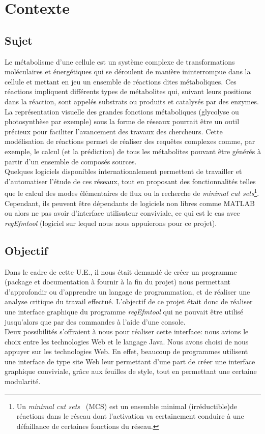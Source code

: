 \section{Contexte}

\subsection{Sujet}
Le métabolisme d'une cellule est un système complexe de transformations moléculaires et énergétiques qui se déroulent de manière ininterrompue dans la cellule et mettant en jeu un ensemble de réactions dites métaboliques. 
Ces réactions impliquent différents types de métabolites qui, suivant leurs positions dans la réaction, sont appelés substrats ou produits et catalysés par des enzymes.\\
La représentation visuelle des grandes fonctions métaboliques (glycolyse ou photosynthèse par exemple) sous la forme de réseaux pourrait être un outil précieux pour faciliter l'avancement des travaux des chercheurs. Cette modélisation de réactions permet de réaliser des requêtes complexes comme, par exemple, le calcul (et la prédiction) de tous les métabolites pouvant être générés à partir d'un ensemble de composés sources.\\
Quelques logiciels disponibles internationalement permettent de travailler et d'automatiser l'étude de ces réseaux, tout en proposant des fonctionnalités telles que le calcul des modes élémentaires de flux ou la recherche de \textit{minimal cut sets}\footnote{Un \textit{minimal cut sets}~\cite{mcs:url} (MCS) est un ensemble minimal (irréductible)de réactions dans le réseau dont l'activation va certainement conduire à une défaillance de certaines fonctions du réseau.}. Cependant, ils peuvent être dépendants de logiciels non libres comme MATLAB ou alors ne pas avoir d'interface utilisateur conviviale, ce qui est le cas avec  \textit{regEfmtool} (logiciel sur lequel nous nous appuierons pour ce projet).

\subsection{Objectif}
Dans le cadre de cette U.E., il nous était demandé de créer un programme (package et documentation à fournir à la fin du projet) nous permettant d'approfondir ou d'apprendre un langage de programmation, et de réaliser une analyse critique du travail effectué. L'objectif de ce projet était donc de réaliser une interface graphique du programme \textit{regEfmtool} qui ne pouvait être utilisé jusqu'alors que par des commandes à l'aide d'une console. \\

Deux possibilités s'offraient à nous pour réaliser cette interface: nous avions le choix entre les technologies Web et le langage Java. Nous avons choisi de nous appuyer sur les technologies Web. En effet, beaucoup de programmes utilisent une interface de type site Web leur permettant d'une part de créer une interface graphique conviviale, grâce aux feuilles de style, tout en permettant une certaine modularité. 